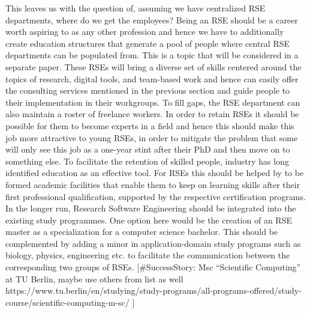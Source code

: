 \documentclass{article}
\begin{document}
This leaves us with the question of, assuming we have centralized RSE departments, where do we get the employees?
Being an RSE should be a career worth aspiring to as any other profession and hence we have to additionally create education structures that generate a pool of people where central RSE departments can be populated from.
This is a topic that will be considered in a separate paper.
These RSEs will bring a diverse set of skills centered around the topics of research, 
digital tools, and team-based work and hence can easily offer the consulting services mentioned in the previous section and guide people to their implementation in their workgroups.
To fill gaps, the RSE department can also maintain a roster of freelance workers.
In order to retain RSEs it should be possible for them to become experts in a field and hence this should make this job more attractive to young RSEs,
in order to mitigate the problem that some will only see this job as a one-year stint after their PhD and then move on to something else.
To facilitate the retention of skilled people, industry has long identified education as an effective tool.
For RSEs this should be helped by to be formed academic facilities that enable them to keep on learning skills after their first professional qualification, supported by the respective certification programs.
In the longer run, Research Software Engineering should be integrated into the existing study programmes.
One option here would be the creation of an RSE master as a specialization for a computer science bachelor.
This should be complemented by adding a minor in application-domain study programs such as biology, physics, engineering etc. to facilitate the communication between the corresponding two groups of RSEs.
[\#SuccessStory: Msc “Scientific Computing” at TU Berlin, maybe use others from list as well https://www.tu.berlin/en/studying/study-programs/all-programs-offered/study-course/scientific-computing-m-sc/ ]

\printbibliography[heading=bibintoc]
\end{document}
